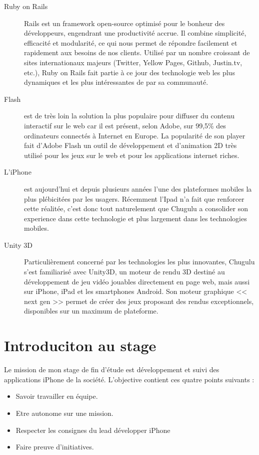 \begin{description}
	\item[Ruby on Rails] Rails est un framework open-source optimisé pour le bonheur des développeurs, engendrant une productivité accrue. Il combine simplicité, efficacité et modularité, ce qui nous permet de répondre facilement et rapidement aux besoins de nos clients. Utilisé par un nombre croissant de sites internationaux majeurs (Twitter, Yellow Pages, Github, Justin.tv, etc.), Ruby on Rails fait partie à ce jour des technologie web les plus dynamiques et les plus intéressantes de par sa communauté.
	\item[Flash] est de très loin la solution la plus populaire pour diffuser du contenu interactif sur le web car il est présent, selon Adobe, sur 99,5\% des ordinateurs connectés à Internet en Europe. La popularité de son player fait d’Adobe Flash un outil de développement et d’animation 2D très utilisé pour les jeux sur le web et pour les applications internet riches.
	\item[L'iPhone] est aujourd'hui et depuis plusieurs années l'une des plateformes mobiles la plus plébicitées par les usagers. Récemment l'Ipad n'a fait que renforcer cette réalitée, c'est donc tout naturelement que Chugulu a consolider son experience dans cette technologie et plus largement dans les technologies mobiles.
	\item[Unity 3D] Particulièrement concerné par les technologies les plus innovantes, Chugulu s’est familiarisé avec Unity3D, un moteur de rendu 3D destiné au développement de jeu vidéo jouables directement en page web, mais aussi sur iPhone, iPad et les smartphones Android. Son moteur graphique << next gen >> permet de créer des jeux proposant des rendus exceptionnels, disponibles sur un maximum de plateforme.
\end{description}



\section{Introduciton au stage} %
Le mission de mon stage de fin d'étude est développement et suivi des applications iPhone de la société. L'objective contient ces quatre points suivants : 

\begin{itemize}
	\item Savoir travailler en équipe.
	\item Etre autonome sur une mission.
	\item Respecter les consignes du lead développer iPhone
	\item Faire preuve d'initiatives.
\end{itemize}


